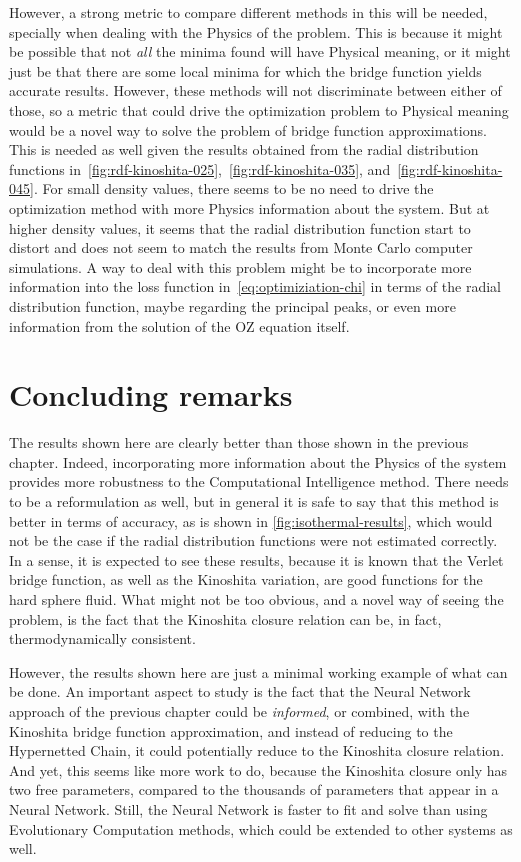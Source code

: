However, a strong metric to compare different methods in this will be needed, specially 
when dealing with the Physics of the problem. This is because it might be possible that not 
\emph{all} the minima found will have Physical meaning, or it might just be that there are 
some local minima for which the bridge function yields accurate results. However, these 
methods will not discriminate between either of those, so a metric that could drive the 
optimization problem to Physical meaning would be a novel way to solve the problem of 
bridge function approximations. This is needed as well given the results obtained from the 
radial distribution functions in~\autoref{fig:rdf-kinoshita-025},~\autoref{fig:rdf-kinoshita-035}, 
and~\autoref{fig:rdf-kinoshita-045}. For small density values, there seems to be no need to 
drive the optimization method with more Physics information about the system. But at higher 
density values, it seems that the radial distribution function start to distort and does 
not seem to match the results from Monte Carlo computer simulations. A way to deal with 
this problem might be to incorporate more information into the loss function 
in~\autoref{eq:optimiziation-chi} in terms of the radial distribution function, maybe 
regarding the principal peaks, or even more information from the solution of the OZ 
equation itself.

\section{Concluding remarks}
The results shown here are clearly better than those shown in the previous chapter. Indeed, 
incorporating more information about the Physics of the system provides more robustness to 
the Computational Intelligence method. There needs to be a reformulation as well, but in 
general it is safe to say that this method is better in terms of accuracy, as is shown in
\autoref{fig:isothermal-results}, which would not be the case if the radial distribution 
functions were not estimated correctly.
In a sense, it is expected to see these results, because it is known that the Verlet bridge 
function, as well as the Kinoshita variation, are good functions for the hard sphere fluid.
What might not be too obvious, and a novel way of seeing the problem, is the fact that the
Kinoshita closure relation can be, in fact, thermodynamically consistent.

However, the results shown here are just a minimal working example of what can be done. 
An important aspect to study is the fact that the Neural Network approach of the previous 
chapter could be \emph{informed}, or combined, with the Kinoshita bridge function 
approximation, and instead of reducing to the Hypernetted Chain, it could potentially 
reduce to the Kinoshita closure relation. And yet, this seems like more work to do, because 
the Kinoshita closure only has two free parameters, compared to the thousands of parameters 
that appear in a Neural Network. Still, the Neural Network is faster to fit and solve than 
using Evolutionary Computation methods, which could be extended to other systems as well.

